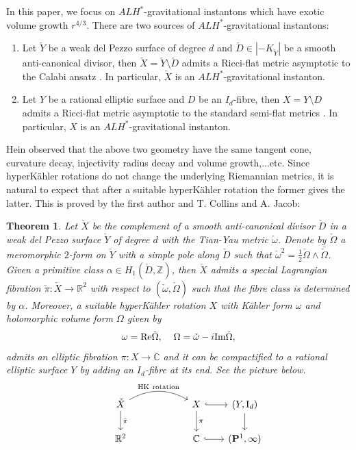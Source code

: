 \documentclass[11pt]{amsart}
\theoremstyle{plain}
\newtheorem{thm}{Theorem}[section]
\theoremstyle{definition}
\numberwithin{equation}{section}
\begin{document}
In this paper, we focus on $ALH^*$-gravitational instantons which have exotic volume growth $r^{4/3}$. There are two sources of $ALH^*$-gravitational instantons: 
\begin{enumerate}
	\item Let $\check{Y}$ be a weak del Pezzo surface of degree $d$ and $\check{D}\in |-K_{\check{Y}}|$ be a smooth anti-canonical divisor, then $\check{X}=\check{Y}\setminus \check{D}$ admits a Ricci-flat metric asymptotic to the Calabi ansatz \cite{TY}. In particular, $\check{X}$ is an $ALH^*$-gravitational instanton. 
	\item Let $Y$ be a rational elliptic surface and $D$ be an $I_d$-fibre, then ${X}={Y}\setminus {D}$ admits a Ricci-flat metric asymptotic to the standard semi-flat metrics \cite{Hein}. In particular, $X$ is an $ALH^*$-gravitational instanton. 
\end{enumerate}
Hein \cite{Hein} observed that the above two geometry have the same tangent cone, curvature decay, injectivity radius decay and volume growth,...etc. Since hyperK\"ahler rotations do not change the underlying Riemannian metrics, it is natural to expect that after a suitable hyperK\"ahler rotation the former gives the latter. This is proved by the first author and T. Collins and A. Jacob: 
\begin{thm}\cite{CJL} \label{theorem:CJL} Let $\check{X}$ be the complement of a smooth anti-canonical divisor $\check{D}$ in a weak del Pezzo surface $\check{Y}$ of degree $d$ with the Tian-Yau metric $\check{\omega}$. Denote by $\check{\Omega}$ a meromorphic $2$-form on $\check{Y}$ with a simple pole along $\check{D}$ such that $\check{\omega}^2=\frac{1}{2}\check{\Omega}\wedge \bar{\check{\Omega}}$. 
	Given a primitive class $\alpha\in H_1(\check{D},\mathbb{Z})$,
	 then $\check{X}$ admits a special Lagrangian fibration $\check{\pi}:\check{X}\rightarrow \mathbb{R}^2$ with respect to $(\check{\omega},\check{\Omega})$ such that the fibre class is determined by $\alpha$. Moreover, a suitable hyperK\"ahler rotation $X$ with K\"ahler form $\omega$ and holomorphic volume form $\Omega$ given by 
	   \begin{align} \label{HK rel}
	   	   \omega=\mbox{Re}\check{\Omega}, \hspace{4mm} \Omega=\check{\omega}-i\mbox{Im}\check{\Omega},
	   \end{align}
	 admits an elliptic fibration $\pi:X\rightarrow \mathbb{C}$ and it can be compactified to a rational elliptic surface $Y$ by adding an $I_d$-fibre at its end. See the picture below.
	\begin{equation*}
		\begin{tikzcd}[column sep=2em]
			&\check{X}\ar[d,"\check{\pi}"]\ar[bend left,rrr,"\mathrm{HK~rotation}"]& & & 
			{X}\ar[d,"\pi"]\ar[r,hook] & ({Y},\mathrm{I}_{d})\ar[d]\\
			&\mathbb{R}^2 & & & \mathbb{C}\ar[r,hook] & (\mathbf{P}^{1},\infty)
		\end{tikzcd}
	\end{equation*}
\end{thm}
\end{document}
